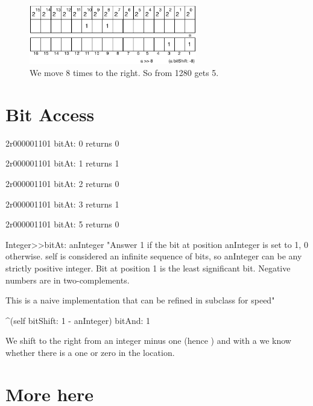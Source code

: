 \documentclass[a4paper,10pt,twoside]{book}
\begin{document}
\begin{figure}[h]
\begin{center}
\includegraphics[width=0.65\textwidth]{16bits-1280shifted8}
\caption{We move 8 times to the right. So from 1280 gets 5.}
\end{center}
\end{figure}







\section{Bit Access}

\begin{code}{}
2r000001101 bitAt: 0
	returns 0 
	
2r000001101 bitAt: 1
	returns 1 
	
2r000001101 bitAt: 2
	returns 0 
			
2r000001101 bitAt: 3
	returns 1
	 
2r000001101 bitAt: 5
	returns 0 	 
\end{code}


\begin{code}{}
Integer>>bitAt: anInteger
	"Answer 1 if the bit at position anInteger is set to 1, 0 otherwise.
	self is considered an infinite sequence of bits, so anInteger can be any strictly positive integer.
	Bit at position 1 is the least significant bit.
	Negative numbers are in two-complements.
	
	This is a naive implementation that can be refined in subclass for speed"
	
	^(self bitShift: 1 - anInteger) bitAnd: 1
\end{code}

We shift to the right from an integer minus one (hence )
and with a  we know whether there is a one or zero in the location.

%

\section{More here}
\end{document}
